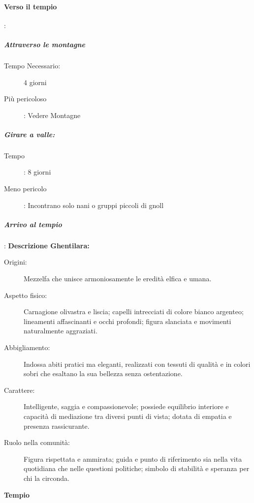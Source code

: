 \documentclass{article}
\begin{document}
  \paragraph{Verso il tempio}: 
            \subparagraph{Attraverso le montagne}
                \begin{description}
                    \item[Tempo Necessario: ]4 giorni
                    \item[Più pericoloso]: Vedere Montagne  
                \end{description}
            \subparagraph{Girare a valle:} 
                \begin{description}
                    \item[Tempo] : 8 giorni
                    \item[Meno pericolo]: Incontrano solo nani o gruppi piccoli di gnoll 
                \end{description}
            \subparagraph{Arrivo al tempio}:
                    \textbf{Descrizione Ghentilara:}
                    \begin{description}
                        \item[Origini:] Mezzelfa che unisce armoniosamente le eredità elfica e umana.

                        \item[Aspetto fisico:] Carnagione olivastra e liscia; capelli intrecciati di colore bianco argenteo; lineamenti affascinanti e occhi profondi; figura slanciata e movimenti naturalmente aggraziati.

                        \item[Abbigliamento:] Indossa abiti pratici ma eleganti, realizzati con tessuti di qualità e in colori sobri che esaltano la sua bellezza senza ostentazione.

                        \item[Carattere:] Intelligente, saggia e compassionevole; possiede equilibrio interiore e capacità di mediazione tra diversi punti di vista; dotata di empatia e presenza rassicurante.

                        \item[Ruolo nella comunità:] Figura rispettata e ammirata; guida e punto di riferimento sia nella vita quotidiana che nelle questioni politiche; simbolo di stabilità e speranza per chi la circonda.
                    \end{description}
                    \textbf{Tempio}
\end{document}
